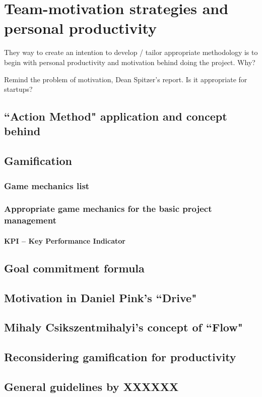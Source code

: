 \chapter{Team-motivation strategies and personal productivity}

They way to create an intention to develop / tailor appropriate methodology is to begin with personal productivity and motivation behind doing the project. Why?

Remind the problem of motivation, Dean Spitzer's report. Is it appropriate for startups?

\section{``Action Method" application and concept behind}

\section{Gamification}

\subsection{Game mechanics list}

\subsection{Appropriate game mechanics for the basic project management}

\subsubsection{KPI -- Key Performance Indicator}

\section{Goal commitment formula}

\section{Motivation in Daniel Pink's ``Drive"}

\section{Mihaly Csikszentmihalyi's concept of ``Flow"}

\section{Reconsidering gamification for productivity}

\section{General guidelines by XXXXXX}